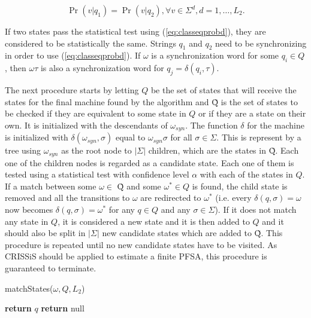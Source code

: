 {\begin{equation}\label{eq:classeqprobd}
\Pr(v|q_1) = \Pr(v|q_2), \forall v \in \Sigma^d, d = 1,\ldots,L_2.
\end{equation}

\noindent If two states pass the statistical test using (\ref{eq:classeqprobd}), they are considered to be statistically the same. Strings $q_1$ and $q_2$ need to be synchronizing in order to use (\ref{eq:classeqprobd}). If $\omega$ is a synchronization word for some $q_i \in Q$, then $\omega\tau$ is also a synchronization word for $q_j = \delta(q_i,\tau)$.


 The next procedure starts by letting $Q$ be the set of states that will receive the states for the final machine found by the algorithm and \~{Q} is the set of states to be checked if they are equivalent to some state in $Q$ or if they are a state on their own. It is initialized with the descendants of $\omega_{syn}$. The function $\delta$ for the machine is initialized with $\delta(\omega_{syn},\sigma)$ equal to $\omega_{syn}\sigma$ for all $\sigma\in\Sigma$. This is represent by a tree using $\omega_{syn}$ as the root node to $|\Sigma|$ children, which are the states in \~{Q}. Each one of the children nodes is regarded as a candidate state. Each one of them is tested using a statistical test with confidence level $\alpha$ with each of the states in $Q$. If a match between some $\omega\in$ \~{Q} and some $\omega^*\in Q$ is found, the child state is removed and all the transitions to $\omega$ are redirected to $\omega^*$ (i.e. every $\delta(q,\sigma) = \omega$ now becomes $\delta(q,\sigma) = \omega^*$ for any $q\in Q$ and any $\sigma\in\Sigma$). If it does not match any state in $Q$, it is considered a new state and it is then added to $Q$ and it should also be split in $|\Sigma|$ new candidate states which are added to \~{Q}. This procedure is repeated until no new candidate states have to be visited. As CRISSiS should be applied to estimate a finite PFSA, this procedure is guaranteed to terminate. 

\begin{algorithm}[t]
\caption{matchStates($\omega, Q, L_2$)\label{alg:matchstates}}
\begin{algorithmic}[1]
					\State \textbf{return} $q$
				\EndIf
			\EndFor
		\EndFor
	\EndFor
	\State \textbf{return} null
\end{algorithmic}
\end{algorithm}

}
